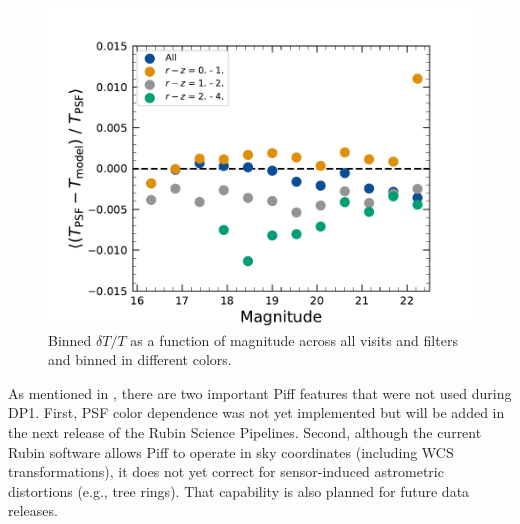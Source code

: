 \begin{figure}[htb!]
\centering
\includegraphics[width=0.98\linewidth]{dT_T_Piff_poly_4_vs_mag.pdf}
\caption{Binned $\delta T/T$ as a function of magnitude across
all visits and filters and binned in different colors.}
\label{fig:psf_residuals_mag_color}
\vspace{0.1cm}
\end{figure}

As mentioned in \cite{PSTN-019}, there are two important Piff features that
were not used during \gls{DP1}. First, PSF color dependence was not yet implemented
but will be added in the next release of the Rubin \gls{Science Pipelines}. Second,
although the current Rubin \gls{software} allows Piff to operate in sky coordinates
(including \gls{WCS} transformations), it does not yet correct for sensor-induced
astrometric distortions (e.g., tree rings). That capability is also planned
for future data releases.


